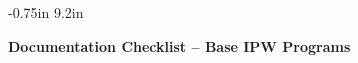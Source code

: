  
\setlength{\topmargin} {-0.75in}
\setlength{\textheight} {9.2in}
 
%
\newcommand{\marginsize}[1]{%
  \setlength{\oddsidemargin}{#1}
  \setlength{\textwidth}{8.5in}                %
  \addtolength{\textwidth}{-2\oddsidemargin}   %
  \setlength{\marginparwidth}{.75\oddsidemargin}%
  \setlength{\marginparsep}{.1\oddsidemargin}  %
  \addtolength{\oddsidemargin}{-1in}           %
  \setlength{\evensidemargin}{\oddsidemargin}  %
}
\marginsize{1.0in}
\pagestyle{empty}



\begin{center}
\Large\bf      Documentation Checklist -- Base IPW Programs
\vspace{.3in}
\end{center}
 
